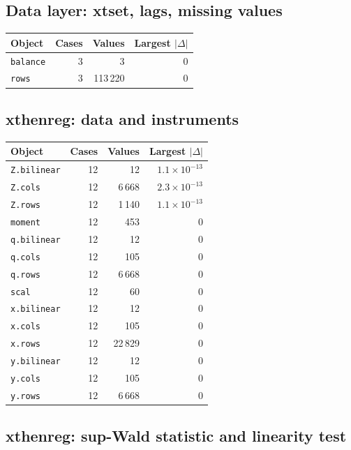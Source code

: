 \documentclass[10.5pt,a4paper]{article}
\begin{document}
\subsection*{Data layer: xtset, lags, missing values}

\begin{longtable}{@{}p{8.2cm}rrr@{}}
\toprule
Object & Cases & Values & Largest $|\Delta|$ \\
\midrule
\endhead
\texttt{balance} & 3 & 3 & 0 \\
\texttt{rows} & 3 & 113\,220 & 0 \\
\bottomrule
\end{longtable}

\subsection*{xthenreg: data and instruments}

\begin{longtable}{@{}p{8.2cm}rrr@{}}
\toprule
Object & Cases & Values & Largest $|\Delta|$ \\
\midrule
\endhead
\texttt{Z.bilinear} & 12 & 12 & $1.1\times10^{-13}$ \\
\texttt{Z.cols} & 12 & 6\,668 & $2.3\times10^{-13}$ \\
\texttt{Z.rows} & 12 & 1\,140 & $1.1\times10^{-13}$ \\
\texttt{moment} & 12 & 453 & 0 \\
\texttt{q.bilinear} & 12 & 12 & 0 \\
\texttt{q.cols} & 12 & 105 & 0 \\
\texttt{q.rows} & 12 & 6\,668 & 0 \\
\texttt{scal} & 12 & 60 & 0 \\
\texttt{x.bilinear} & 12 & 12 & 0 \\
\texttt{x.cols} & 12 & 105 & 0 \\
\texttt{x.rows} & 12 & 22\,829 & 0 \\
\texttt{y.bilinear} & 12 & 12 & 0 \\
\texttt{y.cols} & 12 & 105 & 0 \\
\texttt{y.rows} & 12 & 6\,668 & 0 \\
\bottomrule
\end{longtable}

\subsection*{xthenreg: sup-Wald statistic and linearity test}
\end{document}
